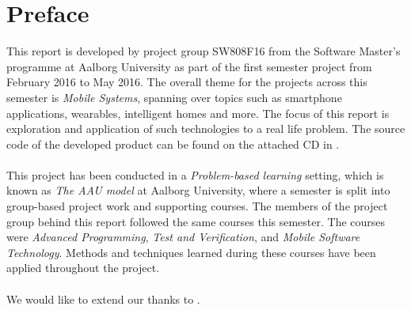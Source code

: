 
\chapter*{Preface}
This report is developed by project group SW808F16 from the Software Master's programme at Aalborg University as part of the first semester project from February 2016 to May 2016. The overall theme for the projects across this semester is \emph{Mobile Systems}, spanning over topics such as smartphone applications, wearables, intelligent homes and more. The focus of this report is exploration and application of such technologies to a real life problem. The source code of the developed product can be found on the attached CD in .
\\\\
This project has been conducted in a \emph{Problem-based learning} setting, which is known as \emph{The AAU model} at Aalborg University, where a semester is split into group-based project work and supporting courses. The members of the project group behind this report followed the same courses this semester. The courses were \emph{Advanced Programming}, \emph{Test and Verification}, and \emph{Mobile Software Technology}. Methods and techniques learned during these courses have been applied throughout the project.
\\\\
We would like to extend our thanks to .







